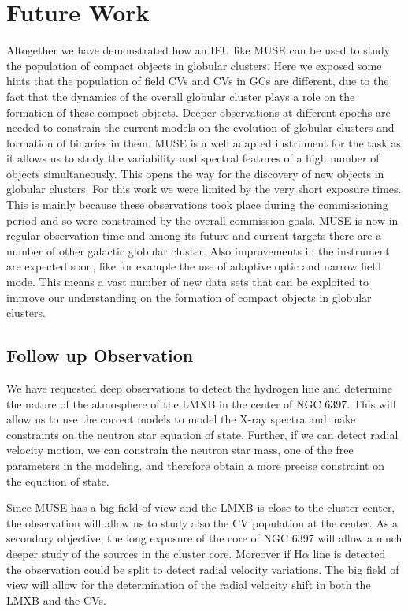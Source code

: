 \chapter{Future Work}\label{chap:future}
\thispagestyle{fancy}


Altogether we have demonstrated how an IFU like MUSE can be used to study the population of compact objects in globular clusters. Here we exposed some hints that the population of field CVs and CVs in  GCs are different, due to the fact that the dynamics of the overall globular cluster plays a role on the formation of these compact objects. Deeper observations at different epochs are needed to constrain the current models on the evolution of globular clusters and formation of binaries in them. MUSE is a well adapted instrument for the task as it allows us to study the variability and spectral features of a high number of objects simultaneously. This opens the way for the discovery of new objects in globular clusters. For this work we were limited by the very short exposure times. This is mainly because these observations took place during the commissioning period and so were constrained by the overall commission goals. MUSE is now in regular observation time and among its future and current targets there are a number of other galactic globular cluster. Also improvements in the instrument are expected soon, like for example the use of adaptive optic and narrow field mode. This means  a vast number of new data sets that can be exploited to improve our understanding on the formation of compact objects in globular clusters. 

\section{Follow up Observation}

We have requested deep observations to detect the hydrogen line and determine the nature of the atmosphere of the LMXB in the center of NGC 6397. This will allow us to use the correct models to model the X-ray spectra and make constraints on the neutron star equation of state. Further, if we can detect radial velocity motion, we can constrain the neutron star mass, one of the free parameters in the modeling, and therefore obtain a more precise constraint on the equation of state. 


 Since MUSE has a big field of view and the LMXB is close to the cluster center, the observation will allow us to study also the CV population at the center. As a secondary objective, the long exposure of the core of NGC 6397 will allow a much deeper study of the sources in the cluster core. Moreover if H$\alpha$ line is detected the observation could be split to detect radial velocity variations. The big field of view will allow for the determination of the radial velocity shift in both the LMXB and the CVs.  
    
